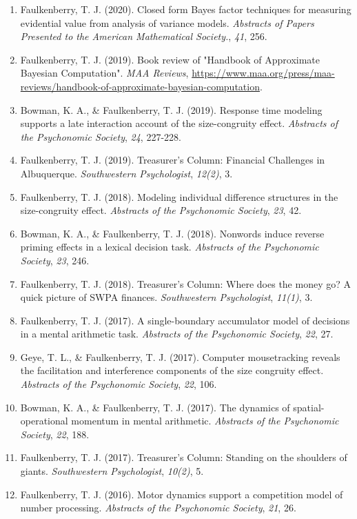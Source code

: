 \documentclass[article,10pt]{article}
\begin{document}
\begin{enumerate}
\item Faulkenberry, T. J. (2020). Closed form Bayes factor techniques for measuring evidential value from analysis of variance models. \emph{Abstracts of Papers Presented to the American Mathematical Society.}, \emph{41}, 256.
\item Faulkenberry, T. J. (2019). Book review of "Handbook of Approximate Bayesian Computation". \emph{MAA Reviews}, \url{https://www.maa.org/press/maa-reviews/handbook-of-approximate-bayesian-computation}.
\item Bowman, K. A., \& Faulkenberry, T. J. (2019). Response time modeling supports a late interaction account of the size-congruity effect. \emph{Abstracts of the Psychonomic Society}, \emph{24}, 227-228.
\item Faulkenberry, T. J. (2019). Treasurer's Column: Financial Challenges in Albuquerque. \emph{Southwestern Psychologist}, \emph{12(2)}, 3.
\item Faulkenberry, T. J. (2018). Modeling individual difference structures in the size-congruity effect. \emph{Abstracts of the Psychonomic Society}, \emph{23}, 42.
\item Bowman, K. A., \& Faulkenberry, T. J. (2018). Nonwords induce reverse priming effects in a lexical decision task. \emph{Abstracts of the Psychonomic Society}, \emph{23}, 246.
\item Faulkenberry, T. J. (2018). Treasurer's Column: Where does the money go? A quick picture of SWPA finances. \emph{Southwestern Psychologist}, \emph{11(1)}, 3.
\item Faulkenberry, T. J. (2017). A single-boundary accumulator model of decisions in a mental arithmetic task. \emph{Abstracts of the Psychonomic Society}, \emph{22}, 27.
\item Geye, T. L., \& Faulkenberry, T. J. (2017). Computer mousetracking reveals the facilitation and interference components of the size congruity effect. \emph{Abstracts of the Psychonomic Society}, \emph{22}, 106.
\item Bowman, K. A., \& Faulkenberry, T. J. (2017). The dynamics of spatial-operational momentum in mental arithmetic. \emph{Abstracts of the Psychonomic Society}, \emph{22}, 188.
\item Faulkenberry, T. J. (2017). Treasurer's Column: Standing on the shoulders of giants. \emph{Southwestern Psychologist}, \emph{10(2)}, 5.
\item Faulkenberry, T. J. (2016). Motor dynamics support a competition model of number processing. \emph{Abstracts of the Psychonomic Society}, \emph{21}, 26.

\end{enumerate}
\end{document}
